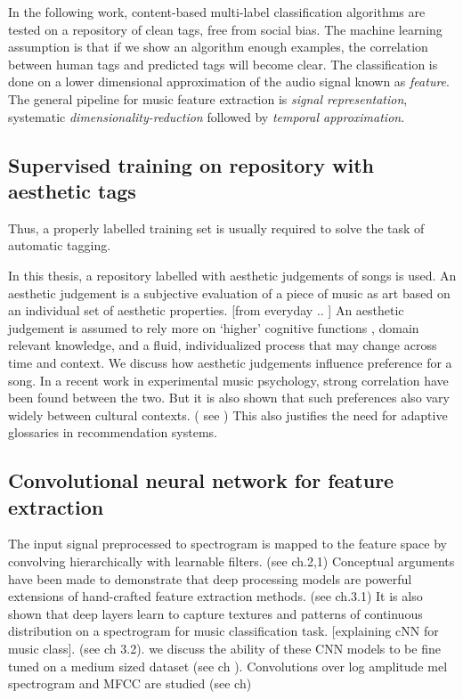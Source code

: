 In the following work, content-based multi-label classification algorithms are tested on a repository of clean tags, free from social bias. The machine learning assumption is that if we show an algorithm enough examples, the correlation between human tags and predicted tags will become clear. The classification is done on a lower dimensional approximation of the audio signal known as \textit{feature}. The general pipeline for music feature extraction is \textit{signal representation}, systematic \textit{dimensionality-reduction} followed by \textit{temporal approximation}.
  



\subsection{Supervised training on repository with aesthetic tags }
 Thus, a properly labelled training set is usually required to solve the task of automatic tagging. 

In this thesis, a repository labelled with aesthetic judgements of songs is used. An aesthetic judgement is a subjective evaluation of a piece of music as art based on an individual set of aesthetic properties. [from everyday .. ] An aesthetic judgement is assumed to rely more on ‘higher’ cognitive functions , domain relevant knowledge, and a fluid, individualized process that may change across time and context. We discuss how aesthetic judgements influence preference for a song. In a recent work in experimental music psychology, strong correlation have been found between the two. But it is also shown that such preferences also vary widely between cultural contexts. ( see ) This also justifies the need for adaptive glossaries in recommendation systems. 

\subsection{Convolutional neural network for feature extraction}
The input signal preprocessed to spectrogram is mapped to the feature space by convolving hierarchically with learnable filters. (see ch.2,1) Conceptual arguments have been made to demonstrate that deep processing models are powerful extensions of hand-crafted feature extraction methods\cite{Yann}. (see ch.3.1) It is also shown that deep layers learn to capture textures and patterns of continuous distribution on a spectrogram for music classification task. [explaining cNN for music class]. (see ch 3.2).  we discuss the ability of these CNN models to be fine tuned on a medium sized dataset (see ch ). Convolutions over log amplitude mel spectrogram and MFCC are studied (see ch)



